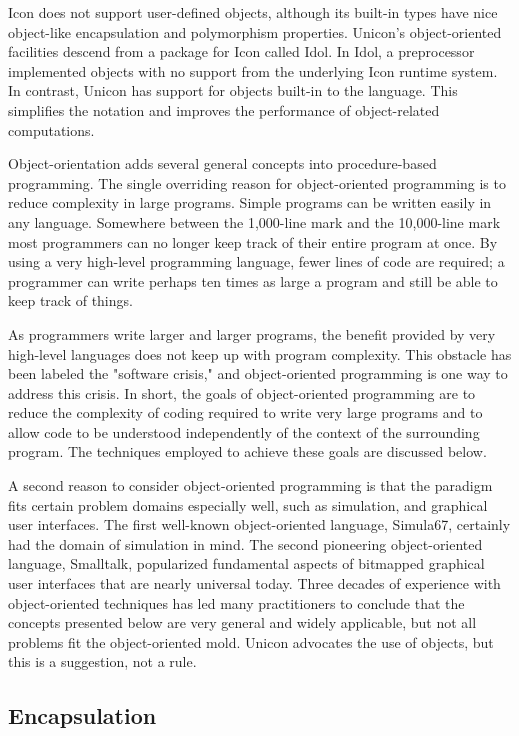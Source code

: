 Icon does not support user-defined objects, although its built-in types
have nice object-like encapsulation and polymorphism properties.
Unicon's object-oriented facilities descend from a
package for Icon called Idol. In Idol, a preprocessor
implemented objects with no support from the underlying Icon runtime
system. In contrast, Unicon has support for objects built-in to the
language. This simplifies the notation and improves the performance of
object-related computations.

Object-orientation adds several general concepts into procedure-based
programming. The single overriding reason for object-oriented programming is to reduce complexity in
large programs. Simple programs can be written easily in any language.
Somewhere between the 1,000-line mark and the 10,000-line mark most
programmers can no longer keep track of their entire program at once.
By using a very high-level programming language, fewer lines of code
are required; a programmer can write perhaps ten times as large a
program and still be able to keep track of things.

As programmers write larger and larger programs, the benefit provided by
very high-level languages does not keep
up with program complexity. This obstacle has been labeled the
"software crisis," and object-oriented
programming is one way to address this crisis. In short, the goals of
object-oriented programming are to reduce the complexity of coding
required to write very large programs and to allow code to be
understood independently of the context of the surrounding program. The
techniques employed to achieve these goals are discussed below. 

A second reason to consider object-oriented programming is that the
paradigm fits certain problem domains especially well, such as
simulation, and graphical user interfaces. The first well-known
object-oriented language, Simula67, certainly had the
domain of simulation in mind. The second pioneering object-oriented
language, Smalltalk, popularized fundamental aspects of bitmapped
graphical user interfaces that are nearly universal today. Three
decades of experience with object-oriented techniques has led many
practitioners to conclude that the concepts presented below are very
general and widely applicable, but not all problems fit the
object-oriented mold. Unicon advocates the use of objects, but this is
a suggestion, not a rule. 

\subsection{Encapsulation}

